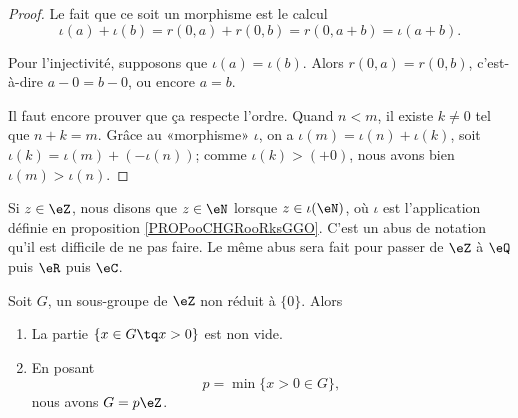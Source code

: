 \begin{proof}
	Le fait que ce soit un morphisme est le calcul
	\begin{equation}
		\iota(a) +\iota(b)=r(0,a) + r(0,b) = r(0,a+b) =\iota(a+b).
	\end{equation}

	Pour l'injectivité, supposons que \( \iota(a)=\iota(b)\). Alors \( r(0,a) = r(0,b) \), c'est-à-dire \( a - 0 = b - 0\), ou encore \( a = b \).

 	Il faut encore prouver que ça respecte l'ordre. Quand \( n < m \), il existe \( k \neq 0 \) tel que \( n + k = m \). Grâce au «morphisme» \( \iota \), on a \( \iota(m) = \iota(n) + \iota(k) \), soit \( \iota(k) = \iota(m) + (-\iota(n)) \); comme  \( \iota(k) > (+0) \), nous avons bien \( \iota(m) > \iota(n)\).
\end{proof}

\begin{normaltext}	\label{NORMooNotationInclusionEntiers}
	Si \( z\in \eZ\), nous disons que \( z\in \eN\) lorsque \( z\in \iota(\eN)\), où \( \iota \) est l'application définie en proposition \ref{PROPooCHGRooRksGGO}. C'est un abus de notation qu'il est difficile de ne pas faire. Le même abus sera fait pour passer de \( \eZ\) à \( \eQ\) puis \( \eR\) puis \( \eC\).
\end{normaltext}

\begin{proposition}	\label{PROPooORABooXRbVoz}
	Soit \( G\), un sous-groupe de \( \eZ\) non réduit à \( \{ 0 \}\). Alors
	\begin{enumerate}
		\item		\label{ITEMooUZBJooUeVmmz}
		      La partie \( \{ x \in G\tq x > 0\}\) est non vide.
		\item	\label{ITEMooIXXFooOWkbPb}
		      En posant
		      \begin{equation}
			      p=\min\{ x>0\in G \},
		      \end{equation}
		      nous avons \( G=p\eZ\).
	\end{enumerate}
\end{proposition}

